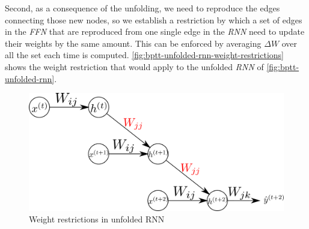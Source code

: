 Second, as a consequence of the unfolding, we need to reproduce the
edges connecting those new nodes, so we establish a restriction by
which a set of edges in the \textit{FFN} that are reproduced from one
single edge in the \textit{RNN} need to update their weights by the
same amount. This can be enforced by averaging $\Delta W$ over all the
set each time is computed.
\autoref{fig:bptt-unfolded-rnn-weight-restrictions} shows the weight
restriction that would apply to the unfolded \textit{RNN} of
\autoref{fig:bptt-unfolded-rnn}.

\begin{figure}[bth]
  \centering
  \includegraphics[width=.95\linewidth]
  {gfx/bptt-unfolded-rnn-weight-restrictions}
  \caption{Weight restrictions in unfolded RNN}
  \label{fig:bptt-unfolded-rnn-weight-restrictions}
\end{figure}




